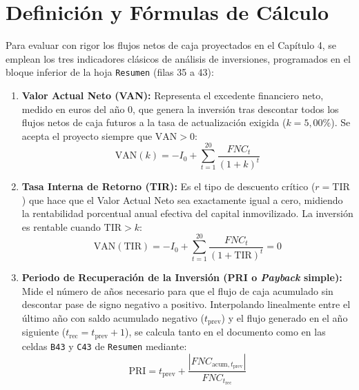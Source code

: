 \documentclass[a4paper,11pt]{report}
\begin{document}
\section{Definición y Fórmulas de Cálculo}
Para evaluar con rigor los flujos netos de caja proyectados en el Capítulo 4, se emplean los tres indicadores clásicos de análisis de inversiones, programados en el bloque inferior de la hoja \texttt{Resumen} (filas 35 a 43):
\begin{enumerate}
    \item \textbf{Valor Actual Neto (VAN):} Representa el excedente financiero neto, medido en euros del año 0, que genera la inversión tras descontar todos los flujos netos de caja futuros a la tasa de actualización exigida ($k = 5,00\%$). Se acepta el proyecto siempre que $\text{VAN} > 0$:
    \begin{equation}
        \text{VAN}(k) = -I_0 + \sum_{t=1}^{20} \frac{FNC_t}{(1+k)^t}
    \end{equation}
    \item \textbf{Tasa Interna de Retorno (TIR):} Es el tipo de descuento crítico ($r = \text{TIR}$) que hace que el Valor Actual Neto sea exactamente igual a cero, midiendo la rentabilidad porcentual anual efectiva del capital inmovilizado. La inversión es rentable cuando $\text{TIR} > k$:
    \begin{equation}
        \text{VAN}(\text{TIR}) = -I_0 + \sum_{t=1}^{20} \frac{FNC_t}{(1+\text{TIR})^t} = 0
    \end{equation}
    \item \textbf{Periodo de Recuperación de la Inversión (PRI o \textit{Payback} simple):} Mide el número de años necesario para que el flujo de caja acumulado sin descontar pase de signo negativo a positivo. Interpolando linealmente entre el último año con saldo acumulado negativo ($t_{\text{prev}}$) y el flujo generado en el año siguiente ($t_{\text{rec}} = t_{\text{prev}} + 1$), se calcula tanto en el documento como en las celdas \texttt{B43} y \texttt{C43} de \texttt{Resumen} mediante:
    \begin{equation}\label{eq:pri_formula}
        \text{PRI} = t_{\text{prev}} + \frac{|FNC_{\text{acum}, t_{\text{prev}}}|}{FNC_{t_{\text{rec}}}}
    \end{equation}
\end{enumerate}
\end{document}
